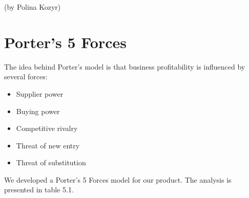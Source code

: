 (by Polina Kozyr)

\p
\section{Porter's 5 Forces}

The idea behind Porter's model \cite{PorterFiveForces} is that business profitability is influenced by several forces:

\begin{itemize}
\item Supplier power
\item Buying power
\item Competitive rivalry
\item Threat of new entry 
\item Threat of substitution
\end{itemize}
We developed a Porter's 5 Forces model for our product. The analysis is presented in table 5.1.

